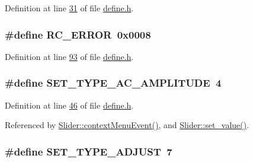 Definition at line \hyperlink{a00090_source_l00031}{31} of file \hyperlink{a00090_source}{define.\+h}.

\hypertarget{a00090_a993a04d3d34ab3326d1786c66e3aaa1a}{
\subsubsection[{R\+C\+\_\+\+E\+R\+R\+O\+R}]{\setlength{\rightskip}{0pt plus 5cm}\#define R\+C\+\_\+\+E\+R\+R\+O\+R~0x0008}}\label{a00090_a993a04d3d34ab3326d1786c66e3aaa1a}


Definition at line \hyperlink{a00090_source_l00093}{93} of file \hyperlink{a00090_source}{define.\+h}.

\hypertarget{a00090_a704f34d2cc6c149f96e9da9d2a1aa8c0}{
\subsubsection[{S\+E\+T\+\_\+\+T\+Y\+P\+E\+\_\+\+A\+C\+\_\+\+A\+M\+P\+L\+I\+T\+U\+D\+E}]{\setlength{\rightskip}{0pt plus 5cm}\#define S\+E\+T\+\_\+\+T\+Y\+P\+E\+\_\+\+A\+C\+\_\+\+A\+M\+P\+L\+I\+T\+U\+D\+E~4}}\label{a00090_a704f34d2cc6c149f96e9da9d2a1aa8c0}


Definition at line \hyperlink{a00090_source_l00046}{46} of file \hyperlink{a00090_source}{define.\+h}.



Referenced by \hyperlink{a00133_source_l00309}{Slider\+::context\+Menu\+Event()}, and \hyperlink{a00133_source_l00102}{Slider\+::set\+\_\+value()}.

\hypertarget{a00090_a16b6b7b5ad68ec0dd62a3c9e97f88adb}{
\subsubsection[{S\+E\+T\+\_\+\+T\+Y\+P\+E\+\_\+\+A\+D\+J\+U\+S\+T}]{\setlength{\rightskip}{0pt plus 5cm}\#define S\+E\+T\+\_\+\+T\+Y\+P\+E\+\_\+\+A\+D\+J\+U\+S\+T~7}}\label{a00090_a16b6b7b5ad68ec0dd62a3c9e97f88adb}


